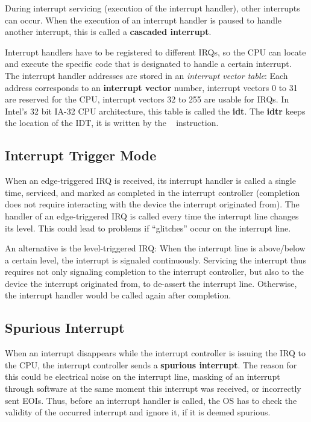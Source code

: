 During interrupt servicing (execution of the interrupt handler), other interrupts can occur. When
the execution of an interrupt handler is paused to handle another interrupt, this is called a
\textbf{\gls{cascaded interrupt}}.

Interrupt handlers have to be registered to different IRQs, so the CPU can locate and execute the
specific code that is designated to handle a certain interrupt. The interrupt handler addresses are
stored in an \textit{interrupt vector table}: Each address corresponds to an \textbf{\gls{interrupt
    vector}} number, interrupt vectors 0 to 31 are reserved for the CPU, interrupt vectors 32 to 255
are usable for IRQs. In Intel's 32 bit IA-32 CPU architecture, this table is called the
\textbf{\gls{idt}}. The \textbf{\gls{idtr}} keeps the location of the IDT, it is written by the
~\cite{x86isa} instruction.

\subsection{Interrupt Trigger Mode}
\label{subsec:triggermode}

When an edge-triggered IRQ is received, its interrupt handler is called a single time, serviced,
and marked as completed in the interrupt controller (completion does not require interacting with
the device the interrupt originated from). The handler of an edge-triggered IRQ is called every
time the interrupt line changes its level. This could lead to problems if ``glitches'' occur on the
interrupt line.

An alternative is the level-triggered IRQ: When the interrupt line is above/below a certain level,
the interrupt is signaled continuously. Servicing the interrupt thus requires not only signaling
completion to the interrupt controller, but also to the device the interrupt originated from, to
de-assert the interrupt line. Otherwise, the interrupt handler would be called again after
completion.

\subsection{Spurious Interrupt}
\label{subsec:spurious}

When an interrupt disappears while the interrupt controller is issuing the IRQ to the CPU, the
interrupt controller sends a \textbf{\gls{spurious interrupt}}. The reason for this could be
electrical noise on the interrupt line, masking of an interrupt through software at the same moment
this interrupt was received, or incorrectly sent EOIs. Thus, before an interrupt handler is called,
the OS has to check the validity of the occurred interrupt and ignore it, if it is deemed spurious.

